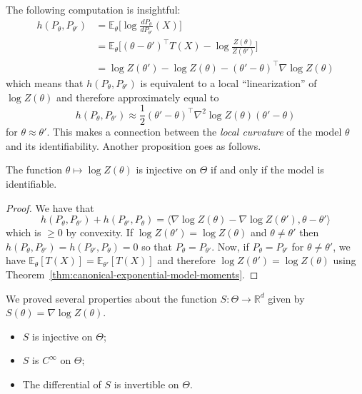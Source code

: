 \documentclass[
	fontsize=11pt, %
	twoside=false, %
	numbers=noenddot, %
]{kaobook}
\newcommand{\E}{\mathbb E}
\newcommand{\R}{\mathbb R}
\newcommand{\grad}{\nabla}
\newcommand{\go}{\rightarrow}
\newcommand{\inr}[1]{\langle #1 \rangle}
\begin{document}
The following computation is insightful:
\begin{align*}
	h(P_\theta, P_{\theta'}) &= \E_{\theta} \Big[ \log \frac{d P_\theta}{d P_{\theta'}}(X) \Big] \\
	&= \E_\theta \Big[ (\theta - \theta')^\top T(X) 
	- \log \frac{Z(\theta)}{Z(\theta')} \Big] \\
	&= \log Z(\theta') - \log Z(\theta) -  (\theta' - \theta)^\top \grad \log Z(\theta)
\end{align*}
which means that $h(P_\theta, P_{\theta'})$ is equivalent to a local ``linearization'' of $\log Z(\theta)$ and therefore approximately equal to
\begin{equation*}
	h(P_\theta, P_{\theta'}) \approx \frac 12 (\theta' - \theta)^\top \grad^2 \log Z(\theta) (\theta' - \theta)
\end{equation*}
for $\theta \approx \theta'$. This makes a connection between the \emph{local curvature} of the model $\theta$ and its identifiability.
Another proposition goes as follows.
\begin{proposition}
	The function $\theta \mapsto \log Z(\theta)$ is injective on $\Theta$ if and only if the model is identifiable.
\end{proposition}
\begin{proof}
	We have that 
	\begin{equation*}
		h(P_\theta, P_{\theta'}) + h(P_{\theta'}, P_{\theta}) = \inr{ \grad \log Z(\theta)  - \grad \log Z(\theta'), \theta - \theta'}	
	\end{equation*}
	which is $\geq 0$ by convexity.
	If $ \log Z(\theta') =  \log Z(\theta)$ and $\theta \neq \theta'$ then $h(P_\theta, P_{\theta'}) = h(P_{\theta'}, P_\theta) = 0$ so that $P_\theta = P_{\theta'}$. Now, if $P_\theta = P_{\theta'}$ for $\theta \neq \theta'$, we have $\E_\theta[T(X)] = \E_{\theta'}[T(X)]$ and therefore $\log Z(\theta') =  \log Z(\theta)$ using Theorem~\ref{thm:canonical-exponential-model-moments}.
\end{proof}


We proved several properties about the function $S : \Theta \go \R^d$ given by $S(\theta) = \grad \log Z(\theta)$.
\begin{itemize}
	\item $S$ is injective on $\Theta$;
	\item $S$ is $C^\infty$ on $\Theta$;
	\item The differential of $S$ is invertible on $\Theta$.
\end{itemize}
\end{document}
